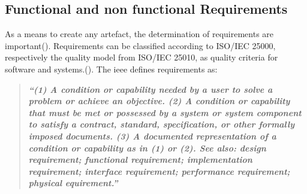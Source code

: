 









\subsection{Functional and non functional Requirements}

As a means to create any artefact, the determination of requirements are important(\cite{Seacord.2003}). Requirements can be classified according to ISO/IEC 25000, respectively the quality model from ISO/IEC 25010, as quality criteria for software and systems.(\cite{ISOIEC25010.2011}). The \ac{ieee} defines requirements as:

\begin{quote}
    \textbf{\textit{\enquote{(1) A condition or capability needed by a user to solve a problem or achieve an objective. (2) A condition or capability that must be met or possessed by a system or system component to satisfy a contract, standard, specification, or other formally imposed documents. (3) A documented representation of a condition or capability as in (1) or (2). See also: design requirement; functional requirement; implementation requirement; interface requirement; performance requirement; physical equirement.}}} \cite{IEEE.1990}
\end{quote}  
   
